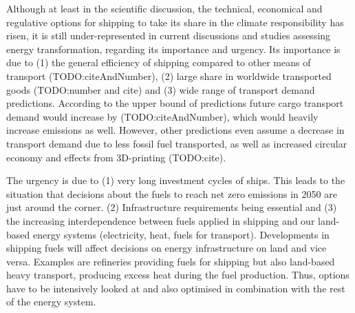 \documentclass[article]{elsarticle}
\begin{document}
Although at least in the scientific discussion, the technical, economical and regulative options for shipping to take its share in the climate responsibility has risen, it is still under-represented in current discussions and studies assessing energy transformation, regarding its importance and urgency. Its importance is due to (1) the general efficiency of shipping compared to other means of transport (TODO:citeAndNumber), (2) large share in worldwide transported goods (TODO:number and cite) and (3) wide range of transport demand predictions. According to the upper bound of predictions future cargo transport demand would increase by (TODO:citeAndNumber), which would heavily increase emissions as well. However, other predictions even assume a decrease in transport demand due to less fossil fuel transported, as well as increased circular economy and effects from 3D-printing (TODO:cite).

The urgency is due to (1) very long investment cycles of ships. This leads to the situation that decisions about the fuels to reach net zero emissions in 2050 are just around the corner. (2) Infrastructure requirements being essential and (3) the increasing interdependence between fuels applied in shipping and our land-based energy systems (electricity, heat, fuels for transport). Developments in shipping fuels will affect decisions on energy infrastructure on land and vice versa. Examples are refineries providing fuels for shipping but also land-based heavy transport, producing excess heat during the fuel production. Thus, options have to be intensively looked at and also optimised in combination with the rest of the energy system. 
\end{document}
